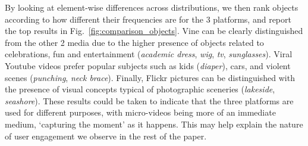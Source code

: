 By looking at element-wise differences across distributions, we then rank objects according to how different their frequencies are for the 3 platforms, and report the top results in Fig.~\ref{fig:comparison_objects}. Vine can be clearly distinguished from the other 2 media due to the higher presence of objects related to celebrations, fun and entertainment (\emph{academic dress}, \emph{wig}, \emph{tv}, \emph{sunglasses}). Viral Youtube videos prefer popular subjects such as kids (\emph{diaper}), cars, and  violent scenes (\emph{punching}, \emph{neck brace}). Finally, Flickr pictures can be distinguished with the presence of visual concepts typical of photographic sceneries (\emph{lakeside}, \emph{seashore}). These results could be taken to indicate that the three platforms are used for different purposes, with micro-videos being more of an immediate medium, `capturing the moment' as it happens. This may help explain the nature of user engagement we observe in the rest of the paper.
%


